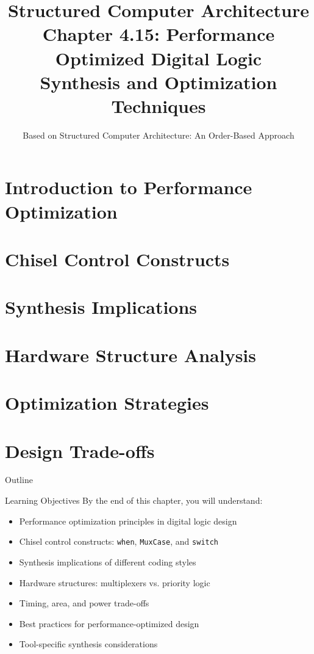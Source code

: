 \documentclass[aspectratio=169]{beamer}
\title[Chapter 4.15: Performance Optimized Digital Logic]{Structured Computer Architecture\\Chapter 4.15: Performance Optimized Digital Logic\\Synthesis and Optimization Techniques}
\author{Based on Structured Computer Architecture: An Order-Based Approach}
\date{}
\begin{document}
\begin{frame}
\titlepage
\end{frame}

\setcounter{section}{0}

\section{Introduction to Performance Optimization}
\section{Chisel Control Constructs}
\section{Synthesis Implications}
\section{Hardware Structure Analysis}
\section{Optimization Strategies}
\section{Design Trade-offs}

\begin{frame}{Outline}
\tableofcontents
\end{frame}

\begin{frame}{Learning Objectives}
By the end of this chapter, you will understand:
\begin{itemize}
\item Performance optimization principles in digital logic design
\item Chisel control constructs: \texttt{when}, \texttt{MuxCase}, and \texttt{switch}
\item Synthesis implications of different coding styles
\item Hardware structures: multiplexers vs. priority logic
\item Timing, area, and power trade-offs
\item Best practices for performance-optimized design
\item Tool-specific synthesis considerations
\end{itemize}
\end{frame}
\end{document}
